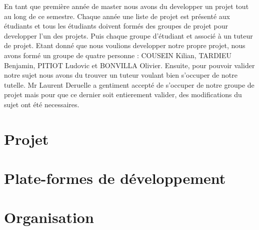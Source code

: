 En tant que première année de master nous avons du developper un projet tout au long de ce semestre. Chaque année une liste de projet est présenté aux étudiants et tous les étudiants doivent formés des groupes de projet pour developper l'un des projets. Puis chaque groupe d'étudiant et associé à un tuteur de projet. Etant donné que nous voulions developper notre propre projet, nous avons formé un groupe de quatre personne : COUSEIN Kilian, TARDIEU Benjamin, PITIOT Ludovic et BONVILLA Olivier. Ensuite, pour pouvoir valider notre sujet nous avons du trouver un tuteur voulant bien s'occuper de notre tutelle. Mr Laurent Deruelle a gentiment accepté de s'occuper de notre groupe de projet mais pour que ce dernier soit entierement valider, des modifications du sujet ont été necessaires.

\section{Projet}	
	

\section{Plate-formes de développement}
	
	
\section{Organisation}
	
